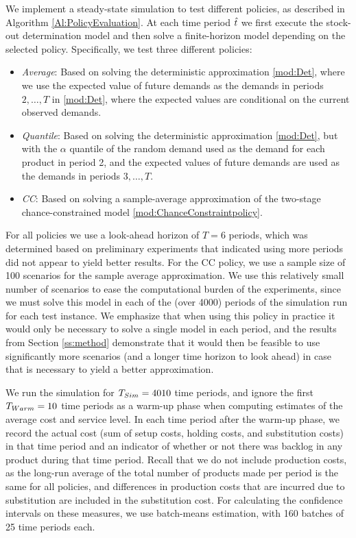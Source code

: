 \documentclass[msom]{oo}
\begin{document}
We implement a steady-state simulation to test different policies, as described in Algorithm \ref{Al:PolicyEvaluation}. At each time period $\hat{t}$ we first execute the stock-out determination model and then solve a finite-horizon model depending on the selected policy. 
Specifically, we test three different policies:
\begin{itemize}
\item {\it Average}: Based on solving the deterministic approximation \eqref{mod:Det}, where we use the expected value of future demands as the demands in periods $2,\ldots,T$ in \eqref{mod:Det}, where the expected values are conditional on the current observed demands.
\item {\it Quantile}: Based on solving the deterministic approximation \eqref{mod:Det}, but with the $\alpha$ quantile of the random demand used as the demand for each product in period 2, and the expected values of future demands are used as the demands in periods $3,\ldots,T$.
\item {\it CC}: Based on solving a sample-average approximation of the two-stage chance-constrained model \eqref{mod:ChanceConstraintpolicy}.
\end{itemize}
For all policies we use a look-ahead horizon of $T=6$ periods, which was determined based on preliminary experiments that indicated using more periods did not appear to yield better results. For the CC policy, we use a sample size of 100 scenarios for the sample average approximation. We use this relatively small number of scenarios to ease the computational burden of the experiments, since we must solve this model in each of the (over 4000) periods of the simulation run for each test instance. We emphasize that when using this policy in practice it would only be necessary to solve a single model in each period, and the results from Section \ref{ss:method} demonstrate that it would then be feasible to use significantly more scenarios (and a longer time horizon to look ahead) in case that is necessary to yield a better approximation.

We run the simulation for $T_{Sim}=4010$ time periods, and ignore the first $T_{Warm}=10$ time periods as a warm-up phase when computing estimates of the average cost and service level. In each time period after the warm-up phase, we record the actual cost (sum of setup costs, holding costs, and substitution costs) in that time period and an indicator of whether or not there was backlog in any product during that time period.  Recall that we do not include production costs, as the long-run average of the total number of products made per period is the same for all policies, and differences in production costs that are incurred due to substitution are included in the substitution cost.
For calculating the confidence intervals on these measures, we use batch-means estimation, with 160 batches of 25 time periods each. 
\end{document}

